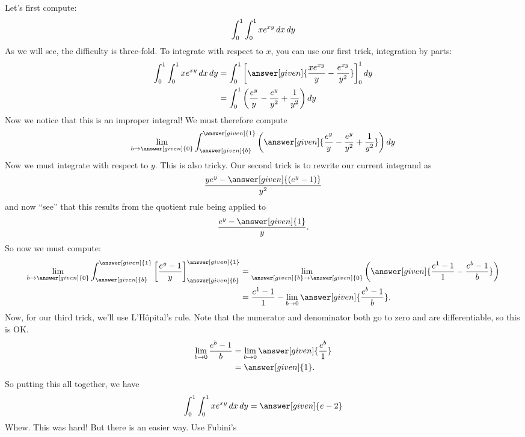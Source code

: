 \documentclass{ximera}
\begin{document}
\begin{example}
\begin{image}
  \end{image}
  \begin{explanation}
    Let's first compute:
    \[
    \int_0^1 \int_0^1 x e^{xy} \mathop{}\!d x \mathop{}\!d y
    \]
    As we will see, the difficulty is three-fold. To integrate with
    respect to $x$, you can use our first trick, integration by parts:
    \begin{align*}
      \int_0^1 \int_0^1 x e^{xy} \d x \d y &= \int_0^1 \eval{\answer[given]{\frac{xe^{xy}}{y}-\frac{e^{xy}}{y^2}}}_0^1\d y\\
      &= \int_0^1 \left(\frac{e^{y}}{y}-\frac{e^y}{y^2} + \frac{1}{y^2}\right)\d y
    \end{align*}
    Now we notice that this is an improper integral!
    We must therefore compute
    \[
    \lim_{b\to\answer[given]{0}}\int_{\answer[given]{b}}^{\answer[given]{1}} \left(\answer[given]{\frac{e^{y}}{y}-\frac{e^y}{y^2} + \frac{1}{y^2}}\right)\d y
    \]
    Now we must integrate with respect to $y$. This is also
    tricky. Our second trick is to rewrite our current integrand as
    \[
    \frac{y e^y - \answer[given]{(e^y -1)}}{y^2}
    \]
    and now ``see'' that this results from the quotient rule being
    applied to
    \[
    \frac{e^y-\answer[given]{1}}{y}.
    \]
    So now we must compute:
    \begin{align*}
      \lim_{b\to \answer[given]{0}}\int_{\answer[given]{b}}^{\answer[given]{1}} \eval{\frac{e^y-1}{y}}_{\answer[given]{b}}^{\answer[given]{1}} &= \lim_{\answer[given]{b}\to \answer[given]{0}}\left(\answer[given]{\frac{e^1-1}{1}-\frac{e^b-1}{b}}\right)\\
      &= \frac{e^1-1}{1}-\lim_{b\to 0}\answer[given]{\frac{e^b-1}{b}}.
    \end{align*}
    Now, for our third trick, we'll use L'H\^opital's rule. Note that
    the numerator and denominator both go to zero and are
    differentiable, so this is OK.
    \begin{align*}
    \lim_{b\to 0}\frac{e^b-1}{b} &= \lim_{b\to 0}\answer[given]{\frac{e^b}{1}}\\
    &= \answer[given]{1}.
    \end{align*}
    So putting this all together, we have
    \[
    \int_0^1 \int_0^1 x e^{xy} \d x \d y = \answer[given]{e-2}
    \]
    Whew. This was hard! But there is an easier way. Use Fubini's

\end{explanation}
\end{example}
\end{document}
